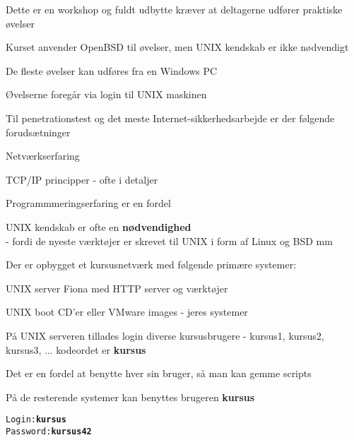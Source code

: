 \documentclass[Screen16to9,17pt]{foils}
\begin{document}
\begin{list1}
\item Dette er en workshop og fuldt udbytte kræver at
  deltagerne udfører praktiske øvelser
\item Kurset anvender OpenBSD til øvelser, men UNIX kendskab
er ikke nødvendigt
\item De fleste øvelser kan udføres fra en Windows PC
\item Øvelserne foregår via login til UNIX maskinen
\begin{list2}
\item Til penetrationstest og det meste Internet-sikkerhedsarbejde er der
følgende forudsætninger
\item Netværkserfaring
\item TCP/IP principper - ofte i detaljer
\item Programmmeringserfaring er en fordel
\item UNIX kendskab er ofte en {\bfseries nødvendighed}\\
- fordi de nyeste værktøjer er skrevet til UNIX i form af Linux og BSD
 mm
\end{list2}
\end{list1}



\begin{list1}
\item Der er opbygget et kursusnetværk med følgende primære systemer:
\begin{list2}
\item UNIX server Fiona med HTTP server og værktøjer
\item UNIX boot CD'er eller VMware images - jeres systemer
\end{list2}
\item På UNIX serveren tillades login diverse kursusbrugere - kursus1,
  kursus2, kursus3, ... kodeordet er {\bf kursus}
\item Det er en fordel at benytte hver sin bruger, så man kan gemme scripts
\item På de resterende systemer kan benyttes brugeren {\bf kursus}
\end{list1}

\begin{alltt}
Login: {\bf kursus}
Password: {\bf kursus42}
\end{alltt}

\end{document}

